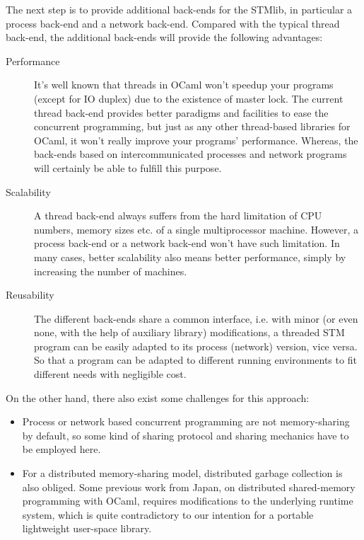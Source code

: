 \documentclass{article}
\begin{document}
The next step is to provide additional back-ends for the STMlib, in particular
a process back-end and a network back-end. Compared with the typical thread
back-end, the additional back-ends will provide the following advantages:


\begin{description}

\item[Performance] It's well known that threads in OCaml won't speedup your
  programs (except for IO duplex) due to the existence of master lock.  The
  current thread back-end provides better paradigms and facilities to ease
  the concurrent programming, but just as any other thread-based libraries for
  OCaml, it won't really improve your programs' performance. Whereas, the
  back-ends based on intercommunicated processes and network programs will
  certainly be able to fulfill this purpose.
\item[Scalability] A thread back-end always suffers from the hard limitation
  of CPU numbers, memory sizes etc. of a single multiprocessor
  machine. However, a process back-end or a network back-end won't have such
  limitation. In many cases, better scalability
  also means better performance, simply by increasing the number of machines.
\item[Reusability] The different back-ends share a common interface, i.e. with
  minor (or even none, with the help of auxiliary library) modifications, a
  threaded STM program can be easily adapted to its process (network) version,
  vice versa. So that a program can be adapted to different running environments
  to fit different needs with negligible cost. 
\end{description}

On the other hand, there also exist some challenges for this approach:

\begin{itemize}
\item Process or network based concurrent programming are not memory-sharing
  by default, so some kind of sharing protocol and sharing mechanics have to be
  employed here.
\item For a distributed memory-sharing model, distributed garbage collection is
  also obliged. Some previous work \cite{DCaml-WAM-99} from Japan, on distributed
  shared-memory programming with OCaml, requires modifications to the underlying
  runtime system, which is quite contradictory to our intention for a portable
  lightweight user-space library. 
\end{itemize}
\end{document}
